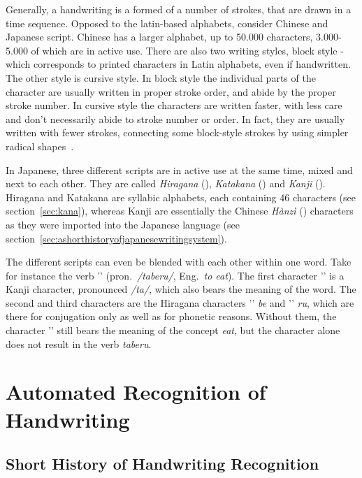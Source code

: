 Generally, a handwriting is a formed of a number of strokes, that are drawn
in a time sequence. Opposed to the latin-based alphabets, consider Chinese and
Japanese script. Chinese has a larger alphabet, up to 50.000 characters, 
3.000-5.000 of which are in active use. There are also two writing styles,
block style - which corresponds to printed characters in Latin alphabets,
even if handwritten. The other style is cursive style. In block style the
individual parts of the character are usually written in proper stroke order,
and abide by the proper stroke number. In cursive style the characters are
written faster, with less care and don't necessarily abide to stroke
number or order. In fact, they are usually written with fewer strokes,
connecting some block-style strokes by using simpler radical 
shapes~.

In Japanese, three different scripts are in active use at the same time,
mixed and next to each other. They are called \emph{Hiragana} (), 
\emph{Katakana} () and \emph{Kanji} ().
Hiragana and Katakana are syllabic alphabets, each containing 46 characters
(see section~\ref{sec:kana}), whereas Kanji are essentially the Chinese 
\emph{Hànzì} () characters as they were imported into the Japanese 
language (see section~\ref{sec:ashorthistoryofjapanesewritingsystem}).

The different scripts can even be blended with each other within one word. 
Take for instance the verb '' (pron.\ \emph{/taberu/}, 
Eng.\ \emph{to eat}). 
The first character '' is a Kanji character, pronounced \emph{/ta/}, 
which also bears the meaning of the word. The second and third characters 
are the Hiragana characters '' \emph{be} and '' \emph{ru}, 
which are there for conjugation only as well as for phonetic reasons. 
Without them, the character '' still bears the meaning of the concept 
\emph{eat}, but the character alone does not result in the verb \emph{taberu}.

\section{Automated Recognition of Handwriting}
\label{sec:autorecoofhandwriting}

\subsection{Short History of Handwriting Recognition}
\label{sec:shorthistoryofhwr}

